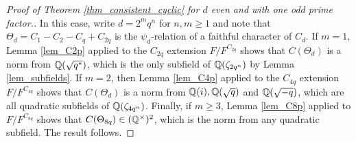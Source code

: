 \begin{proof}[Proof of Theorem \ref{thm_consistent_cyclic} for $d$ even and with one odd prime factor.]
    In this case, write $d=2^mq^n$ for $n,m\geq 1$ and note that $\Theta_{d}=C_1-C_2-C_q+C_{2q}$ is the $\psi_d$-relation of a faithful character of $C_d$. If $m=1$, Lemma \ref{lem_C2p} applied to the $C_{2q}$ extension $F/F^{C_{2q}}$ shows that $C(\Theta_d)$ is a norm from $\mathbb{Q}(\sqrt{q^*})$, which is the only subfield of $\mathbb{Q}(\zeta_{2q^n})$ by Lemma \ref{lem_subfields}. If $m=2$, then Lemma \ref{lem_C4p} applied to the $C_{4q}$ extension $F/F^{C_{4q}}$ shows that $C(\Theta_{d})$ is a norm from $\mathbb{Q}(i),\mathbb{Q}(\sqrt{q})$ and $\mathbb{Q}(\sqrt{-q})$, which are all quadratic subfields of $\mathbb{Q}(\zeta_{4q^n})$. Finally, if $m\geq3$, Lemma \ref{lem_C8p} applied to $F/F^{C_{8q}}$ shows that $C(\Theta_{8q})\in(\mathbb{Q}^{\times})^2$, which is the norm from any quadratic subfield. The result follows.
\end{proof}

